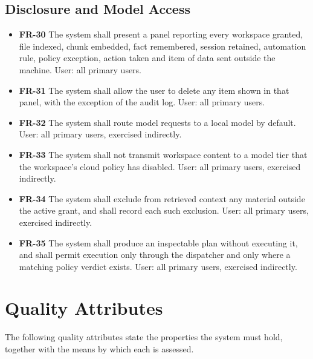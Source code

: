 \documentclass{FastFyp}
\begin{document}
\subsection{Disclosure and Model Access}
\begin{itemize}
    \item \textbf{FR-30} The system shall present a panel reporting every workspace granted, file indexed, chunk embedded, fact remembered, session retained, automation rule, policy exception, action taken and item of data sent outside the machine. User: all primary users.
    \item \textbf{FR-31} The system shall allow the user to delete any item shown in that panel, with the exception of the audit log. User: all primary users.
    \item \textbf{FR-32} The system shall route model requests to a local model by default. User: all primary users, exercised indirectly.
    \item \textbf{FR-33} The system shall not transmit workspace content to a model tier that the workspace's cloud policy has disabled. User: all primary users, exercised indirectly.
    \item \textbf{FR-34} The system shall exclude from retrieved context any material outside the active grant, and shall record each such exclusion. User: all primary users, exercised indirectly.
    \item \textbf{FR-35} The system shall produce an inspectable plan without executing it, and shall permit execution only through the dispatcher and only where a matching policy verdict exists. User: all primary users, exercised indirectly.
\end{itemize}

\section{Quality Attributes}
The following quality attributes state the properties the system must hold, together with the means by which each is assessed.
\end{document}

